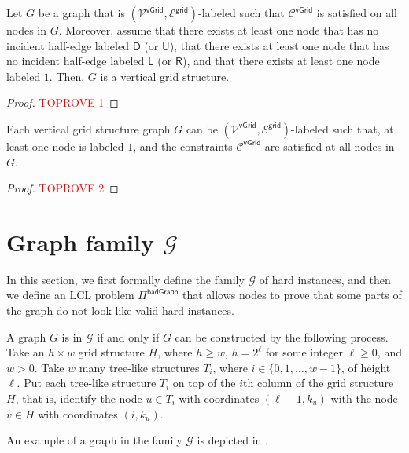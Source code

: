 \documentclass[11pt]{article}
\newcommand{\lleft}{\mathsf {L}}
\newcommand{\lright}{\mathsf {R}}
\newcommand{\lup}{\mathsf {U}}
\newcommand{\ldown}{\mathsf {D}}
\newcommand{\lgrid}{\mathsf {grid}}
\newcommand{\lvgrid}{\mathsf {vGrid}}
\newcommand{\lbadgraph}{\mathsf {badGraph}}
\begin{document}
\begin{lemma}\label{lem:vgrid}
	Let $G$ be a graph that is $(\mathcal{V^\lvgrid},\mathcal{E^\lgrid})$-labeled such that $\mathcal{C}^{\lvgrid}$ is satisfied on all nodes in $G$. Moreover, assume that there exists at least one node that has no incident half-edge labeled $\ldown$ (or $\lup$), that there exists at least one node that has no incident half-edge labeled $\lleft$ (or $\lright$), and that there exists at least one node labeled $1$. Then, $G$ is a vertical grid structure.
\end{lemma}
\begin{proof}\textcolor{red}{TOPROVE 1}\end{proof}
\begin{lemma}\label{lem:vgrid2}
	Each vertical grid structure graph $G$ can be $(\mathcal{V^\lvgrid},\mathcal{E^\lgrid})$-labeled such that, at least one node is labeled $1$, and the constraints $\mathcal{C}^{\lvgrid}$ are satisfied at all nodes in $G$. 
\end{lemma}
\begin{proof}\textcolor{red}{TOPROVE 2}\end{proof}

\section{Graph family \texorpdfstring{\boldmath$\mathcal{G}$}{G}}\label{sec:graph-family}

In this section, we first formally define the family $\mathcal{G}$ of hard instances, and then we define an LCL problem $\Pi^{\lbadgraph}$ that allows nodes to prove that some parts of the graph do not look like valid hard instances.

\begin{definition}
	A graph $G$ is in $\mathcal{G}$ if and only if $G$ can be constructed by the following process.
	Take an $h\times w$ grid structure $H$, where $h \ge w$, $h = 2^\ell$ for some integer $\ell \ge 0$, and $w > 0$. Take $w$ many tree-like structures $T_i$, where $i\in\{0,1,\dotsc, w-1\}$, of height $\ell$. Put each tree-like structure $T_i$ on top of the $i$th column of the grid structure $H$, that is, identify the node $u\in T_i$ with coordinates $(\ell-1,k_u)$ with the node $v\in H$ with coordinates $(i,k_u)$. 
\end{definition}
An example of a graph in the family $\mathcal{G}$ is depicted in .
\end{document}
